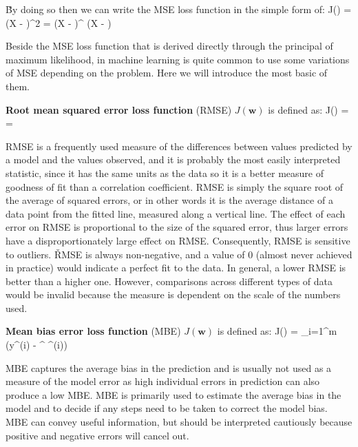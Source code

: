 \v

By doing so then we can write the MSE loss function in the simple form of:
\bse
J() =  (X  - )^2 =
 (X  - )^{\intercal} (X  - )
\ese

Beside the MSE loss function that is derived directly through the principal of maximum likelihood, in machine
learning is quite common to use some variations of MSE depending on the problem. Here we will introduce the most
basic of them.

\textbf{Root mean squared error loss function} (RMSE) $J(\boldsymbol{w})$ is defined as:
\bse
J() =  = 
\ese
\ed

RMSE is a frequently used measure of the differences between values predicted by a model and the values observed, and
it is probably the most easily interpreted statistic, since it has the same units as the data so it is a better
measure of goodness of fit than a correlation coefficient. RMSE is simply the square root of the average of squared
errors, or in other words it is the average distance of a data point from the fitted line, measured along a vertical
line. The effect of each error on RMSE is proportional to the size of the squared error, thus larger errors have a
disproportionately large effect on RMSE. Consequently, RMSE is sensitive to outliers. \v

RMSE is always non-negative, and a value of 0 (almost never achieved in practice) would indicate a perfect fit to the
data. In general, a lower RMSE is better than a higher one. However, comparisons across different types of data would
be invalid because the measure is dependent on the scale of the numbers used.

\textbf{Mean bias error loss function} (MBE) $J(\boldsymbol{w})$ is defined as:
\bse
J() =  \sum_{i=1}^{m} (y^{(i)} - ^{\intercal} ^{(i)})
\ese
\ed

MBE captures the average bias in the prediction and is usually not used as a measure of the model error as high
individual errors in prediction can also produce a low MBE. MBE is primarily used to estimate the average bias in the
model and to decide if any steps need to be taken to correct the model bias. MBE can convey useful information, but
should be interpreted cautiously because positive and negative errors will cancel out.

